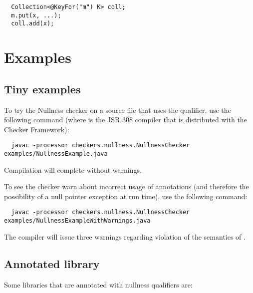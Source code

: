 \begin{Verbatim}
  Collection<@KeyFor("m") K> coll;
  m.put(x, ...);
  coll.add(x);
\end{Verbatim}


\section{Examples\label{nullness-example}}

\subsection{Tiny examples\label{nullness-tiny-examples}}

To try the Nullness checker on a source file that uses the  qualifier,
use the following command (where  is the JSR 308 compiler that
is distributed with the Checker Framework):

\begin{Verbatim}
  javac -processor checkers.nullness.NullnessChecker examples/NullnessExample.java
\end{Verbatim}

\noindent
Compilation will complete without warnings.

To see the checker warn about incorrect usage of annotations (and therefore the
possibility of a null pointer exception at run time), use the following command:

\begin{Verbatim}
  javac -processor checkers.nullness.NullnessChecker examples/NullnessExampleWithWarnings.java
\end{Verbatim}

\noindent
The compiler will issue three warnings regarding violation of the semantics of
.


\subsection{Annotated library\label{nullness-annotated-library}}

Some libraries that are annotated with nullness qualifiers are:


